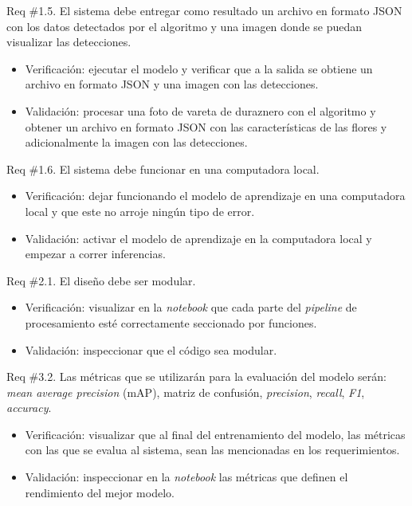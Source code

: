 \documentclass[
11pt, %
codirector, %
]{charter}
\begin{document}
Req \#1.5. El sistema debe entregar como resultado un archivo en formato JSON con los datos detectados por el algoritmo y una imagen donde se puedan visualizar las detecciones.

\begin{itemize}
	\item Verificación: ejecutar el modelo y verificar que a la salida se obtiene un archivo en formato JSON y una imagen con las detecciones.
	
	\item Validación: procesar una foto de vareta de duraznero con el algoritmo y obtener un archivo en formato JSON con las características de las flores y adicionalmente la imagen con las detecciones. 
\end{itemize}

Req \#1.6. El sistema debe funcionar en una computadora local.

\begin{itemize}
	\item Verificación: dejar funcionando el modelo de aprendizaje en una computadora local y que este no arroje ningún tipo de error.
	
	\item Validación: activar el modelo de aprendizaje en la computadora local y empezar a correr inferencias. 
\end{itemize}

Req \#2.1. El diseño debe ser modular.

\begin{itemize}
	\item Verificación: visualizar en la \textit{notebook} que cada parte del \textit{pipeline} de procesamiento esté correctamente seccionado por funciones.
	
	\item Validación: inspeccionar que el código sea modular. 
\end{itemize}

Req \#3.2. Las métricas que se utilizarán para la evaluación del modelo serán: \textit{mean average precision} (mAP), matriz de confusión, \textit{precision}, \textit{recall}, \textit{F1}, \textit{accuracy}.

\begin{itemize}
	\item Verificación: visualizar que al final del entrenamiento del modelo, las métricas con las que se evalua al sistema, sean las mencionadas en los requerimientos.
	
	\item Validación: inspeccionar en la \textit{notebook} las métricas que definen el rendimiento del mejor modelo. 
\end{itemize}
\end{document}

